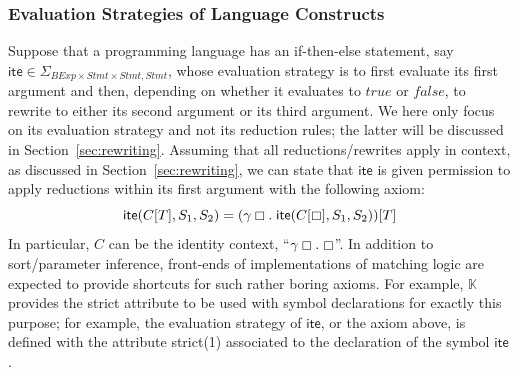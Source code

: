 \documentclass[UTF8,11pt]{article}
\theoremstyle{plain}
\theoremstyle{definition}
\theoremstyle{remark}
\newcommand{\K}{\mbox{$\mathbb{K}$}\xspace}
\newcommand{\hole}{\boxempty}
\newcommand{\BExp}{\textit{BExp}}
\newcommand{\Stmt}{\textit{Stmt}}
\newcommand{\ite}{\textsf{ite}}
\newcommand{\ttrue}{\textit{true}}
\newcommand{\ffalse}{\textit{false}}
\begin{document}
\subsubsection{Evaluation Strategies of Language Constructs}

Suppose that a programming language has an if-then-else statement,
say $\ite\in\Sigma_{\BExp\times\Stmt\times\Stmt,\Stmt}$,
whose evaluation strategy is to first evaluate its first argument and then, depending
on whether it evaluates to $\ttrue$ or $\ffalse$, to rewrite to either
its second argument or its third argument.
We here only focus on its evaluation strategy and not its reduction rules;
the latter will be discussed in Section~\ref{sec:rewriting}.
Assuming that all reductions/rewrites apply in context, as discussed in
Section~\ref{sec:rewriting}, we can state that $\ite$ is given permission to
apply reductions within its first argument with the following axiom:
$$
\ite(C[T],S_1,S_2) = (\gamma\hole.\;\ite(C[\hole],S_1,S_2))[T]
$$
In particular, $C$ can be the identity context, ``$\gamma \hole .\; \hole$''.
In addition to sort/parameter inference, front-ends of implementations of
matching logic are expected to provide shortcuts for such rather boring
axioms.
For example, \K provides the \textsf{strict} attribute to be used with symbol
declarations for exactly this purpose; for example, the evaluation strategy
of $\ite$, or the axiom above, is defined with the attribute
\textsf{strict(1)} associated to the declaration of the symbol $\ite$.
\end{document}
